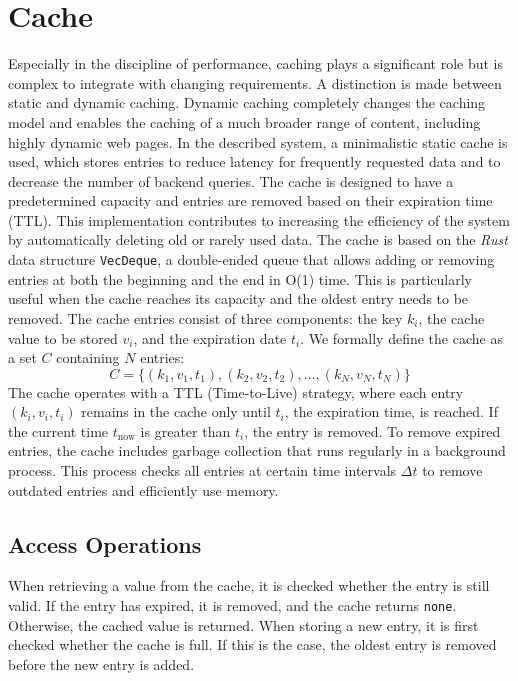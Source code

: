 \documentclass[twocolumn]{webofc}
\begin{document}
    \section{Cache}
    Especially in the discipline of performance, caching plays a significant role but is complex to integrate with changing requirements\cite{wikipediacache}. A distinction is made between static and dynamic caching. Dynamic caching completely changes the caching model and enables the caching of a much broader range of content, including highly dynamic web pages\cite{cloudflare2024caching}. In the described system, a minimalistic static cache is used, which stores entries to reduce latency for frequently requested data and to decrease the number of backend queries. The cache is designed to have a predetermined capacity and entries are removed based on their expiration time (TTL). This implementation contributes to increasing the efficiency of the system by automatically deleting old or rarely used data. The cache is based on the \textit{Rust} data structure \texttt{VecDeque}, a double-ended queue that allows adding or removing entries at both the beginning and the end in O(1) time\cite{rust_vecdeque}. This is particularly useful when the cache reaches its capacity and the oldest entry needs to be removed. The cache entries consist of three components: the key \( k_i \), the cache value to be stored \( v_i \), and the expiration date \( t_i \). We formally define the cache as a set \( C \) containing \( N \) entries:
    \[
        C = \{ (k_1, v_1, t_1), (k_2, v_2, t_2), \dots, (k_N, v_N, t_N) \}
    \]
    The cache operates with a TTL (Time-to-Live) strategy, where each entry \( (k_i, v_i, t_i) \) remains in the cache only until \( t_i \), the expiration time, is reached. If the current time \( t_{\text{now}} \) is greater than \( t_i \), the entry is removed. To remove expired entries, the cache includes garbage collection that runs regularly in a background process. This process checks all entries at certain time intervals \( \Delta t \) to remove outdated entries and efficiently use memory.

    \subsection{Access Operations}
    When retrieving a value from the cache, it is checked whether the entry is still valid. If the entry has expired, it is removed, and the cache returns \texttt{none}. Otherwise, the cached value is returned. When storing a new entry, it is first checked whether the cache is full. If this is the case, the oldest entry is removed before the new entry is added.
\end{document}
